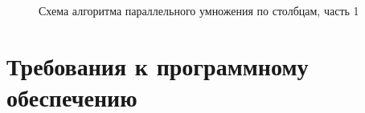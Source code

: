 \documentclass[12pt,a4paper]{report}
\begin{document}
\begin{figure}[h!]
    \caption{Схема алгоритма параллельного умножения по столбцам, часть 1}
    \label{fig:image}
\end{figure}

\newpage
\section{Требования к программному обеспечению}
\end{document}
